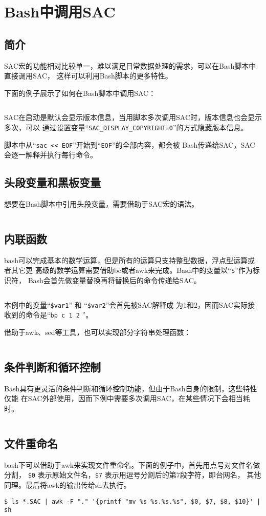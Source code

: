 \section{Bash中调用SAC}
\label{sec:sac-bash}

\subsection{简介}
SAC宏的功能相对比较单一，难以满足日常数据处理的需求，可以在Bash脚本中直接调用SAC，
这样可以利用Bash脚本的更多特性。

下面的例子展示了如何在Bash脚本中调用SAC：
\inputminted{bash}{./call-in-script/simple-script.sh}

SAC在启动是默认会显示版本信息，当用脚本多次调用SAC时，版本信息也会显示多次，可以
通过设置变量``\verb|SAC_DISPLAY_COPYRIGHT=0|''的方式隐藏版本信息。

脚本中从``\texttt{sac << EOF}''开始到``\texttt{EOF}''的全部内容，都会被
Bash传递给SAC，SAC会逐一解释并执行每行命令。

\subsection{头段变量和黑板变量}
想要在Bash脚本中引用头段变量，需要借助于SAC宏的语法。
\inputminted{bash}{./call-in-script/variables.sh}

\subsection{内联函数}
bash可以完成基本的数学运算，但是所有的运算只支持整型数据，浮点型运算或者其它更
高级的数学运算需要借助bc或者awk来完成。Bash中的变量以``\verb|$|''作为标识符，
Bash会首先做变量替换再将替换后的命令传递给SAC。
\inputminted{bash}{./call-in-script/arithmetic-functions.sh}

本例中的变量``\verb|$var1|'' 和 ``\verb|$var2|''会首先被SAC解释成
为1和2，因而SAC实际接收到的命令是``\texttt{bp c 1 2} ''。

借助于awk、sed等工具，也可以实现部分字符串处理函数：
\inputminted{bash}{./call-in-script/string-functions.sh}

\subsection{条件判断和循环控制}
Bash具有更灵活的条件判断和循环控制功能，但由于Bash自身的限制，这些特性仅能
在SAC外部使用，因而下例中需要多次调用SAC，在某些情况下会相当耗时。
\inputminted{bash}{./call-in-script/do-loops.sh}

\subsection{文件重命名}
\label{subsec:rename-in-bash}
bash下可以借助于awk来实现文件重命名。下面的例子中，首先用点号对文件名做分割，
\verb|$0| 表示原始文件名，\verb|$7| 表示用逗号分割后的第7段字符，即台网名，
其他同理。最后将awk的输出传给sh去执行。
\begin{verbatim}
$ ls *.SAC | awk -F "." '{printf "mv %s %s.%s.%s", $0, $7, $8, $10}' | sh
\end{verbatim}

